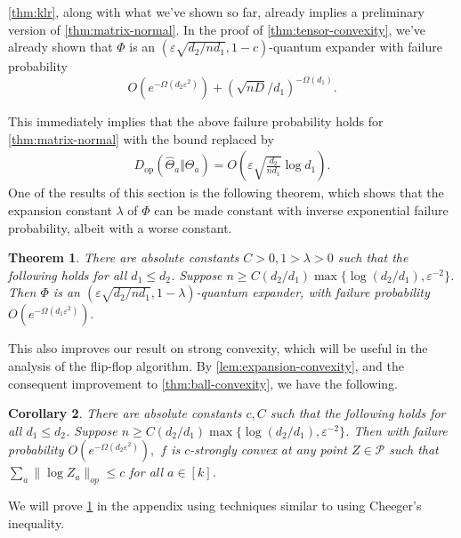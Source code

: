 \documentclass[aos]{imsart}
\newtheorem{theorem}{Theorem}[section]
\newtheorem{corollary}[theorem]{Corollary}
\theoremstyle{definition}
\numberwithin{equation}{section}
\DeclareMathOperator{\op}{op}
\newcommand{\eps}{\varepsilon}
\newcommand{\SPD}{\mathcal{P}}
\begin{document}
\cref{thm:klr}, along with what we've shown so far, already implies a preliminary version of \cref{thm:matrix-normal}. In the proof of \cref{thm:tensor-convexity}, we've already shown that $\Phi$ is an $(\eps \sqrt{d_2/n d_1}, 1 - c)$-quantum expander with failure probability 
$$O(e^{ - \Omega( d_2 \eps^2)}) + (\sqrt{nD}/{d_1})^{ - \Omega(d_1)}.$$ 

This immediately implies that the above failure probability holds for \cref{thm:matrix-normal} with the bound replaced by
\begin{align*}
  D_{\op}(\widehat{\Theta}_a \Vert \Theta_a) = O\left(\eps \sqrt{\frac{d_{2}}{n d_1}} \log d_1\right).
\end{align*}
One of the results of this section is the following theorem, which shows that the expansion constant $\lambda$ of $\Phi$ can be made constant with inverse exponential failure probability, albeit with a worse constant. 

\begin{theorem}\label{thm:operator-cheeger}
There are absolute constants $ C > 0, 1 > \lambda > 0$ such that the following holds for all $d_1 \leq d_2$. Suppose $n \geq C (d_2/d_1) \max\{\log (d_2/d_1),  \eps^{-2}\} $. Then $\Phi$ is an $(\eps \sqrt{d_2/n d_1}, 1 - \lambda)$-quantum expander, with failure probability $O(e^{ - \Omega( d_1 \eps^2)}).$ 
\end{theorem}
This also improves our result on strong convexity, which will be useful in the analysis of the flip-flop algorithm. By \cref{lem:expansion-convexity}, and the consequent improvement to \cref{thm:ball-convexity}, we have the following.
\begin{corollary}\label{cor:matrix-convexity} There are absolute constants $c, C$ such that the following holds for all $d_1 \leq d_2$. Suppose $n \geq C (d_2/d_1) \max\{\log (d_2/d_1),  \eps^{-2}\} $. Then with failure probability $O(e^{ - \Omega( d_2 \eps^2)}),$ $f$ is $c$-strongly convex at any point $Z \in \SPD$ such that $\sum_a \|\log Z_a\|_{op} \leq c$ for all $a \in [k]$.
\end{corollary}

We will prove \cref{thm:operator-cheeger} in the appendix using techniques similar to \cite{FM20} using Cheeger's inequality. 
\end{document}
